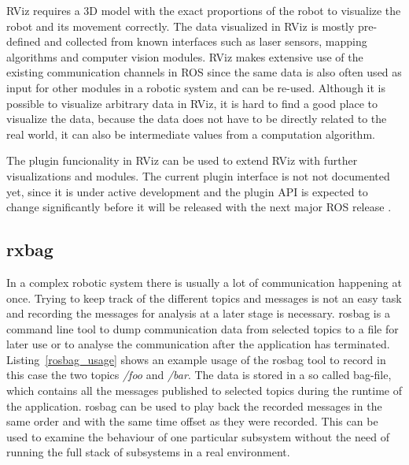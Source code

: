 

RViz requires a 3D model with the exact proportions of the robot to visualize the robot and its movement correctly. The data visualized in RViz is mostly pre-defined and collected from known interfaces such as laser sensors, mapping algorithms and computer vision modules. RViz makes extensive use of the existing communication channels in ROS since the same data is also often used as input for other modules in a robotic system and can be re-used. Although it is possible to visualize arbitrary data in RViz, it is hard to find a good place to visualize the data, because the data does not have to be directly related to the real world, it can also be intermediate values from a computation algorithm.

The plugin funcionality in RViz can be used to extend RViz with further visualizations and modules. The current plugin interface is not not documented yet, since it is under active development and the plugin API is expected to change significantly before it will be released with the next major ROS release \cite{rvizPlugin}.

\subsection{rxbag}
In a complex robotic system there is usually a lot of communication happening at once. Trying to keep track of the different topics and messages is not an easy task and recording the messages for analysis at a later stage is necessary. rosbag is a command line tool to dump communication data from selected topics to a file for later use or to analyse the communication after the application has terminated. Listing~\ref{rosbag_usage} shows an example usage of the rosbag tool to record in this case the two topics \emph{/foo} and \emph{/bar}. The data is stored in a so called bag-file, which contains all the messages published to selected topics during the runtime of the application. rosbag can be used to play back the recorded messages in the same order and with the same time offset as they were recorded. This can be used to examine the behaviour of one particular subsystem without the need of running the full stack of subsystems in a real environment.


